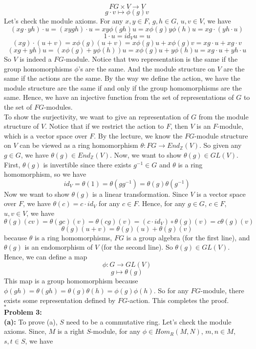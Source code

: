 \documentclass[12pt]{amsart}
\newcommand{\Z}{\mathbb{Z}}
\begin{document}
\[FG\times V\to V\]
\[g\cdot v\mapsto \phi(g)v\]
Let's check the module axioms. For any $x,y\in F$, $g,h\in G$, $u,v\in V$, we have 
\[(xg\cdot yh)\cdot u=(xygh)\cdot u=xy\phi(gh)u=x\phi(g)y\phi(h)u=xg\cdot (yh\cdot u)\]
\[1\cdot u=id_V u=u\]
\[(xg)\cdot (u+v)=x\phi(g)(u+v)=x\phi(g)u+x\phi(g)v=xg\cdot u+xg\cdot v\]
\[(xg+yh)u=(x\phi(g)+y\phi(h))u=x\phi(g)u+y\phi(h)u=xg\cdot u +yh\cdot u\]
So $V$ is indeed a $FG$-module. Notice that two representation is the same if the group homomorphisms $\phi$'s are the same. And the module structure on $V$ are the same if the actions are the same. By the way we define the action, we have the module structure are the same if and only if the group homomorphisms are the same. Hence, we have an injective function from the set of representations of $G$ to the set of $FG$-modules.\\
To show the surjectivity, we want to give an representation of $G$ from the module structure of $V$. Notice that if we restrict the action to $F$, then $V$ is an $F$-module, which is a vector space over $F$. By the lecture, we know the $FG$-module structure on $V$ can be viewed as a ring homomorphism $\theta: FG\to End_\Z(V)$. So given any $g\in G$, we have $\theta(g)\in End_\Z(V)$. Now, we want to show $\theta(g)\in GL(V)$. First, $\theta(g)$ is invertible since there exists $g^{-1}\in G$ and $\theta$ is a ring homomorphism, so we have 
\[id_V=\theta(1)=\theta(gg^{-1})=\theta(g)\theta(g^{-1})\]
Now we want to show $\theta(g)$ is a linear transformation. Since $V$ is a vector space over $F$, we have $\theta(c)=c\cdot id_V$ for any $c\in F$. Hence, for any $g\in G$, $c\in F$, $u,v\in V$, we have
\[\theta(g)(cv)=\theta(gc)(v)=\theta(cg)(v)=(c\cdot id_V)\circ \theta(g)(v)=c\theta(g)(v)\]
\[\theta(g)(u+v)=\theta(g)(u)+\theta(g)(v)\]
because $\theta$ is a ring homomorphisms, $FG$ is a group algebra (for the first line), and $\theta(g)$ is an endomorphism of $V$ (for the second line). So $\theta(g)\in GL(V)$. Hence, we can define a map 
\[\phi:G\to GL(V)\]
\[g\mapsto \theta(g)\]
This map is a group homomorphism because $\phi(gh)=\theta(gh)=\theta(g)\theta(h)=\phi(g)\phi(h)$. So for any $FG$-module, there exists some representation defined by $FG$-action. This completes the proof.
\\\phantom{qed}\hfill$\square$\\
\textbf{Problem 3:}\\
\textbf{(a): }To prove (a), $S$ need to be a commutative ring. Let's check the module axioms. Since, $M$ is a right $S$-module, for any $\phi\in Hom_R(M,N)$, $m,n\in M$, $s,t\in S$, we have 
\end{document}
